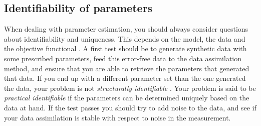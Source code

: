 



\subsection{Identifiability of parameters}
\label{sec:intro_identifiability}
When dealing with parameter estimation, you should always consider
questions about identifiability and uniqueness. This depends on the
model, the data and the objective functional
\cite{hadjicharalambous2015analysis}. A first test should be to
generate synthetic data with some prescribed parameters, feed this
error-free data to the data assimilation method, and ensure that you
are able to retrieve the parameters that generated that data. If you
end up with a different parameter set than the one generated the data,
your problem is not \emph{structurally identifiable}
\cite{chabiniok2016multiphysics}. Your problem is said to be
\emph{practical identifiable} if the parameters can be determined
uniquely based on the data at hand. If the test passes you should try
to add noise to the data, and see if your data assimilation is stable
with respect to noise in the measurement.


